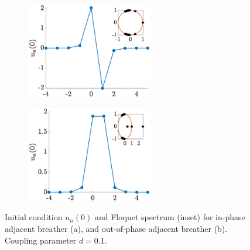 \documentclass[12pt,reqno]{amsart}
\theoremstyle{definition}
\begin{document}
\begin{figure}
	\begin{center}
	\begin{subfigure}{0.3\linewidth}
		\caption{}
		\includegraphics[width=5.5cm]{SGintersitepm.eps} \hspace{-0.5cm}
		\label{fig:SGintersitea} 
	\end{subfigure}
	\begin{subfigure}{0.3\linewidth}
		\caption{}
		\includegraphics[width=5.5cm]{SGintersitepp.eps} \hspace{-0.5cm}
		\label{fig:SGintersiteb} 
	\end{subfigure}
	\end{center}
	\caption{Initial condition $u_n(0)$ and Floquet spectrum (inset) for in-phase adjacent breather (a), and out-of-phase adjacent breather (b). Coupling parameter $d=0.1$. }
	\label{fig:SGintersite}
\end{figure}
\end{document}

